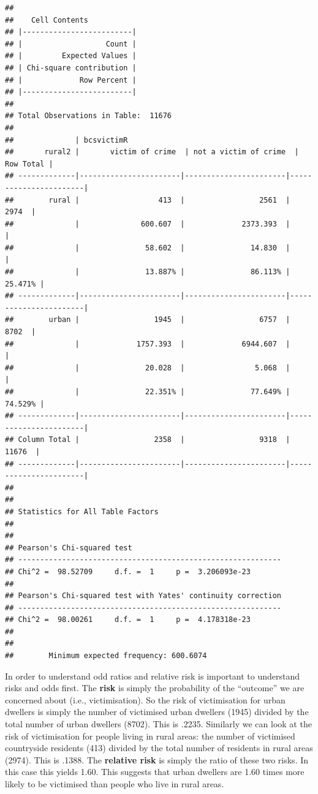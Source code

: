 \documentclass[]{book}
\theoremstyle{definition}
\theoremstyle{definition}
\theoremstyle{definition}
\theoremstyle{remark}
\begin{document}
\begin{verbatim}
## 
##    Cell Contents
## |-------------------------|
## |                   Count |
## |         Expected Values |
## | Chi-square contribution |
## |             Row Percent |
## |-------------------------|
## 
## Total Observations in Table:  11676 
## 
##              | bcsvictimR 
##       rural2 |       victim of crime  | not a victim of crime  |             Row Total | 
## -------------|-----------------------|-----------------------|-----------------------|
##        rural |                  413  |                 2561  |                 2974  | 
##              |              600.607  |             2373.393  |                       | 
##              |               58.602  |               14.830  |                       | 
##              |               13.887% |               86.113% |               25.471% | 
## -------------|-----------------------|-----------------------|-----------------------|
##        urban |                 1945  |                 6757  |                 8702  | 
##              |             1757.393  |             6944.607  |                       | 
##              |               20.028  |                5.068  |                       | 
##              |               22.351% |               77.649% |               74.529% | 
## -------------|-----------------------|-----------------------|-----------------------|
## Column Total |                 2358  |                 9318  |                11676  | 
## -------------|-----------------------|-----------------------|-----------------------|
## 
##  
## Statistics for All Table Factors
## 
## 
## Pearson's Chi-squared test 
## ------------------------------------------------------------
## Chi^2 =  98.52709     d.f. =  1     p =  3.206093e-23 
## 
## Pearson's Chi-squared test with Yates' continuity correction 
## ------------------------------------------------------------
## Chi^2 =  98.00261     d.f. =  1     p =  4.178318e-23 
## 
##  
##        Minimum expected frequency: 600.6074
\end{verbatim}

In order to understand odd ratios and relative risk is important to
understand risks and odds first. The \textbf{risk} is simply the
probability of the ``outcome'' we are concerned about (i.e.,
victimisation). So the risk of victimisation for urban dwellers is
simply the number of victimised urban dwellers (1945) divided by the
total number of urban dwellers (8702). This is .2235. Similarly we can
look at the risk of victimisation for people living in rural areas: the
number of victimised countryside residents (413) divided by the total
number of residents in rural areas (2974). This is .1388. The
\textbf{relative risk} is simply the ratio of these two risks. In this
case this yields 1.60. This suggests that urban dwellers are 1.60 times
more likely to be victimised than people who live in rural areas.
\end{document}

